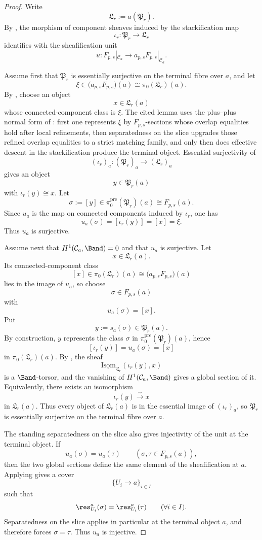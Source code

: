 \begin{proof}
Write
\[
\mathfrak L_r:=a(\mathfrak P_r).
\]
By , the morphism of
component sheaves induced by the stackification map
\[
\iota_r:\mathfrak P_r\to \mathfrak L_r
\]
identifies with the sheafification unit
\[
u:F_{p,s}|_{\mathcal C_a}\to a_{p,s}F_{p,s}|_{\mathcal C_a}.
\]

Assume first that $\mathfrak P_r$ is essentially surjective on the terminal fibre over $a$, and let
\[
\xi\in \bigl(a_{p,s}F_{p,s}\bigr)(a)\cong \pi_0(\mathfrak L_r)(a).
\]
By , choose an object
\[
x\in \mathfrak L_r(a)
\]
whose connected-component class is $\xi$. The cited lemma uses the
plus--plus normal form of :
first one represents $\xi$ by $F_{p,s}$-sections whose overlap equalities
hold after local refinements, then separatedness on the slice upgrades those
refined overlap equalities to a strict matching family, and only then does
effective descent in the stackification produce the terminal object.
Essential surjectivity of
\[
(\iota_r)_a:(\mathfrak P_r)_a\to (\mathfrak L_r)_a
\]
gives an object
\[
y\in \mathfrak P_r(a)
\]
with $\iota_r(y)\cong x$. Let
\[
\sigma:=[y]\in \pi_0^{\mathrm{pre}}(\mathfrak P_r)(a)\cong F_{p,s}(a).
\]
Since $u_a$ is the map on connected components induced by $\iota_r$, one has
\[
u_a(\sigma)=[\iota_r(y)]=[x]=\xi.
\]
Thus $u_a$ is surjective.

Assume next that $H^1(\mathcal C_a,\Band)=0$ and that $u_a$ is surjective. Let
\[
x\in \mathfrak L_r(a).
\]
Its connected-component class
\[
[x]\in \pi_0(\mathfrak L_r)(a)\cong \bigl(a_{p,s}F_{p,s}\bigr)(a)
\]
lies in the image of $u_a$, so choose
\[
\sigma\in F_{p,s}(a)
\]
with
\[
u_a(\sigma)=[x].
\]
Put
\[
y:=s_a(\sigma)\in \mathfrak P_r(a).
\]
By construction, $y$ represents the class $\sigma$ in $\pi_0^{\mathrm{pre}}(\mathfrak P_r)(a)$, hence
\[
[\iota_r(y)]=u_a(\sigma)=[x]
\]
in $\pi_0(\mathfrak L_r)(a)$. By , the sheaf
\[
\underline{\mathrm{Isom}}_{\mathfrak L_r}(\iota_r(y),x)
\]
is a $\Band$-torsor, and the vanishing of $H^1(\mathcal C_a,\Band)$ gives a global section of it. Equivalently, there exists an isomorphism
\[
\iota_r(y)\xrightarrow{\sim} x
\]
in $\mathfrak L_r(a)$. Thus every object of $\mathfrak L_r(a)$ is in the essential image of $(\iota_r)_a$, so $\mathfrak P_r$ is essentially surjective on the terminal fibre over $a$.

The standing separatedness on the slice also gives injectivity of the unit at the
terminal object. If
\[
u_a(\sigma)=u_a(\tau)
\qquad
(\sigma,\tau\in F_{p,s}(a)),
\]
then the two global sections define the same element of the sheafification at $a$.
Applying  gives a cover
\[
\{U_i\to a\}_{i\in I}
\]
such that
\[
\res_{U_i}^a(\sigma)=\res_{U_i}^a(\tau)
\qquad
(\forall i\in I).
\]
Separatedness on the slice applies in particular at the terminal object
$a$, and therefore forces $\sigma=\tau$. Thus $u_a$ is injective.


\end{proof}
